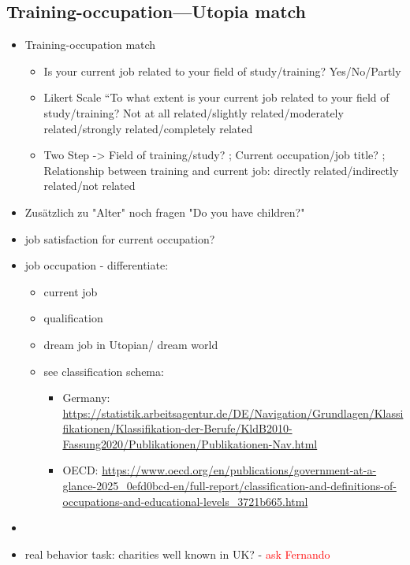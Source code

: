 \documentclass[jou,floatsintext]{apa7}
\begin{document}
\subsection{Training-occupation---Utopia match}

\begin{itemize}
    \item Training-occupation match
    \begin{itemize}
        \item Is your current job related to your field of study/training? Yes/No/Partly
        \item Likert Scale “To what extent is your current job related to your field of study/training? Not at all related/slightly related/moderately related/strongly related/completely related
        \item Two Step -> Field of training/study? ; Current occupation/job title? ; Relationship between training and current job: directly related/indirectly related/not related
    \end{itemize}
    \item Zusätzlich zu "Alter" noch fragen "Do you have children?"
\end{itemize}


\begin{itemize}
    \item job satisfaction for current occupation?
    \item job occupation - differentiate:
    \begin{itemize}
        \item current job
        \item qualification
        \item dream job in Utopian/ dream world
        \item see classification schema:
        \begin{itemize}
            \item Germany: \url{https://statistik.arbeitsagentur.de/DE/Navigation/Grundlagen/Klassifikationen/Klassifikation-der-Berufe/KldB2010-Fassung2020/Publikationen/Publikationen-Nav.html}
            \item OECD: \url{https://www.oecd.org/en/publications/government-at-a-glance-2025_0efd0bcd-en/full-report/classification-and-definitions-of-occupations-and-educational-levels_3721b665.html}
        \end{itemize}
    \end{itemize}
    \item 
    \item real behavior task: charities well known in UK? - \textcolor{red}{ask Fernando}
\end{itemize}
\end{document}
